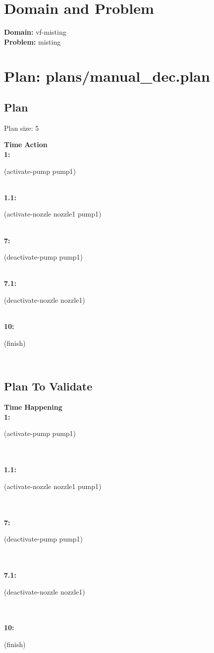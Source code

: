 \documentclass[a4paper,12pt]{article}
\author{\mbox{\sc {\sc Val}}}
\newcommand{\headingtimeaction}{{\bf Time} \qquad \= {\bf Action}\\[0.8ex]}
\newcommand{\headingtimehappening}{{\bf Time} \qquad \= {\bf Happening}\\[0.8ex]}
\newcommand{\atime}[1]{{\bf #1:}}
\newcommand{\action}[1]{{\sf #1}}
\newcommand{\listrow}[1]{\begin{minipage}[t]{11.5cm} #1 \end{minipage}}
\begin{document}
 \maketitle 
\section{Domain and Problem}
{\bf Domain:} vf-misting\\
{\bf Problem:} misting
\section{\sloppy Plan: plans/\-manual\_dec.plan}
\subsection{Plan}
Plan size: 5
\begin{tabbing}
\headingtimeaction 
\atime{1} \> \listrow{\action{(activate-pump pump1)}}\\
\atime{1.1} \> \listrow{\action{(activate-nozzle nozzle1 pump1)}}\\
\atime{7} \> \listrow{\action{(deactivate-pump pump1)}}\\
\atime{7.1} \> \listrow{\action{(deactivate-nozzle nozzle1)}}\\
\atime{10} \> \listrow{\action{(finish)}}\\
\end{tabbing}
\subsection{Plan To Validate}
\begin{tabbing}
\headingtimehappening 
\atime{1}  \> \listrow{\action{(activate-pump pump1)}}\\
\\\atime{1.1}  \> \listrow{\action{(activate-nozzle nozzle1 pump1)}}\\
\\\atime{7}  \> \listrow{\action{(deactivate-pump pump1)}}\\
\\\atime{7.1}  \> \listrow{\action{(deactivate-nozzle nozzle1)}}\\
\\\atime{10}  \> \listrow{\action{(finish)}}\\
\end{tabbing}
\end{document}
